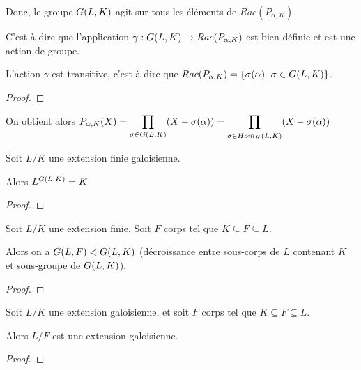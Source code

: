 Donc, le groupe $G(L, K)$ agit sur tous les éléments de
$Rac(P_{\alpha, K})$.

C'est-à-dire que l'application
$\gamma : G(L, K) \rightarrow Rac(P_{\alpha, K})$ est bien définie
et est une action de groupe.

\begin{proposition}
	L'action $\gamma$ est transitive, c'est-à-dire que $Rac(P_{\alpha, K}) =
	\left\{\sigma(\alpha) \, | \, \sigma \in G(L, K) \right\}$.
\end{proposition}

\ifdefined\outputproof
\begin{proof}

\end{proof}
\fi

On obtient alors $P_{\alpha, K}(X) = \displaystyle \prod_{\sigma \in
	G(L, K)} (X - \sigma(\alpha)) = \displaystyle \prod_{\sigma \in
		Hom_{K}(L, \overline{K})} (X - \sigma(\alpha))$

\begin{theorem}
	Soit $L/K$ une extension finie galoisienne.

	Alors $L^{G(L, K)} = K$
\end{theorem}

\ifdefined\outputproof
\begin{proof}

\end{proof}
\fi

\begin{proposition}
	Soit $L/K$ une extension finie.
	Soit $F$ corps tel que $K \subseteq F \subseteq L$.

	Alors on a $G(L, F) < G(L, K)$ (décroissance entre
	sous-corps de $L$ contenant $K$ et sous-groupe de $G(L, K)$).
\end{proposition}

\ifdefined\outputproof
\begin{proof}

\end{proof}
\fi

\begin{proposition}
	Soit $L/K$ une extension galoisienne, et soit $F$ corps tel que $K \subseteq
	F \subseteq L$.

	Alors $L/F$ est une extension galoisienne.
\end{proposition}

\ifdefined\outputproof
\begin{proof}

\end{proof}
\fi

